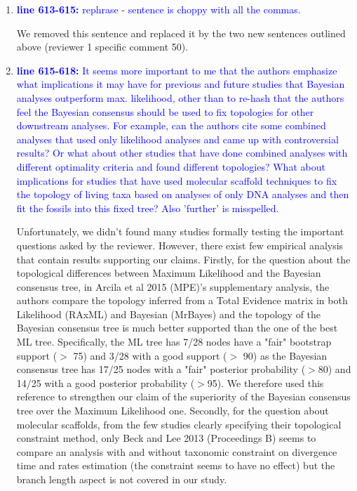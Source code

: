 \documentclass[12pt,letterpaper]{article}
\begin{document}
\begin{enumerate}
\item{\textcolor{blue}{\textbf{line 613-615:} rephrase - sentence is choppy with all the commas. }}

We removed this sentence and replaced it by the two new sentences outlined above (reviewer 1 specific comment 50).

\item{\textcolor{blue}{\textbf{line 615-618:} It seems more important to me that the authors emphasize what implications it may have for previous and future studies that Bayesian analyses outperform max. likelihood, other than to re-hash that the authors feel the Bayesian consensus should be used to fix topologies for other downstream analyses.
For example, can the authors cite some combined analyses that used only likelihood analyses and came up with controversial results?
Or what about other studies that have done combined analyses with different optimality criteria and found different topologies?
What about implications for studies that have used molecular scaffold techniques to fix the topology of living taxa based on analyses of only DNA analyses and then fit the fossils into this fixed tree?
Also 'further' is misspelled.  }}

Unfortunately, we didn't found many studies formally testing the important questions asked by the reviewer. However, there exist few empirical analysis that contain results supporting our claims.
Firstly, for the question about the topological differences between Maximum Likelihood and the Bayesian consensus tree, in Arcila et al 2015 (MPE)'s supplementary analysis, the authors compare the topology inferred from a Total Evidence matrix in both Likelihood (RAxML) and Bayesian (MrBayes) and the topology of the Bayesian consensus tree is much better supported than the one of the best ML tree. Specifically, the ML tree has 7/28 nodes have a "fair" bootstrap support ($>$ 75) and 3/28 with a good support ($>$ 90) as the Bayesian consensus tree has 17/25 nodes with a "fair" posterior probability ($>$80) and 14/25 with a good posterior probability ($>$95). We therefore used this reference to strengthen our claim of the superiority of the Bayesian consensus tree over the Maximum Likelihood one.
Secondly, for the question about molecular scaffolds, from the few studies clearly specifying their topological constraint method, only Beck and Lee 2013 (Proceedings B) seems to compare an analysis with and without taxonomic constraint on divergence time and rates estimation (the constraint seems to have no effect) but the branch length aspect is not covered in our study.


\end{enumerate}
\end{document}
